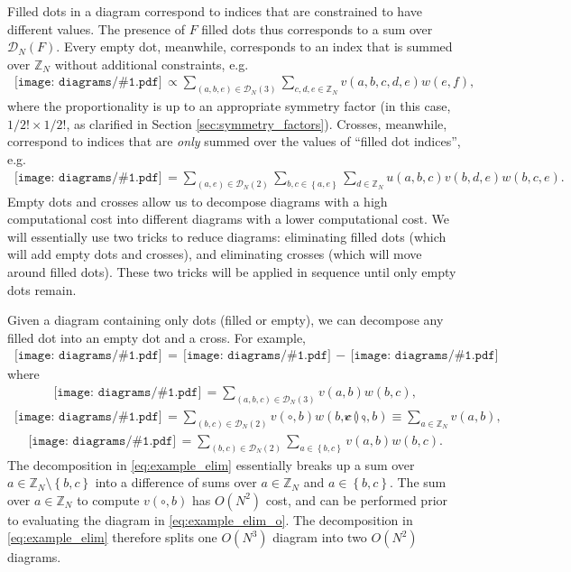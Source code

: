 \documentclass[nofootinbib,notitlepage,11pt]{revtex4-2}
\newcommand{\p}[1]{\left(#1\right)} %
\renewcommand{\set}[1]{\left\{#1\right\}} %
\newcommand{\1}{\mathds{1}}
\newcommand{\D}{\mathcal{D}}
\newcommand{\ZZ}{\mathbb{Z}}
\newcommand{\diagram}[1]
{\,\texttt{[image: diagrams/\#1.pdf]}\,}
\begin{document}
Filled dots in a diagram correspond to indices that are constrained to
have different values.  The presence of $F$ filled dots thus
corresponds to a sum over $\D_N\p{F}$.  Every empty dot, meanwhile,
corresponds to an index that is summed over $\ZZ_N$ without additional
constraints, e.g.
\begin{align}
  \diagram{example_o}
  \propto \sum_{\p{a,b,e}\in\D_N\p{3}} \sum_{c,d,e\in\ZZ_N}
  v\p{a,b,c,d,e} w\p{e,f},
\end{align}
where the proportionality is up to an appropriate symmetry factor (in
this case, $1/2!\times1/2!$, as clarified in Section
\ref{sec:symmetry_factors}).  Crosses, meanwhile, correspond to
indices that are {\it only} summed over the values of ``filled dot
indices'', e.g.
\begin{align}
  \diagram{example_x}
  = \sum_{\p{a,e}\in\D_N\p{2}} \sum_{b,c\in\set{a,e}}
  \sum_{d\in\ZZ_N} u\p{a,b,c} v\p{b,d,e} w\p{b,c,e}.
\end{align}
Empty dots and crosses allow us to decompose diagrams with a high
computational cost into different diagrams with a lower computational
cost.  We will essentially use two tricks to reduce diagrams:
eliminating filled dots (which will add empty dots and crosses), and
eliminating crosses (which will move around filled dots).  These two
tricks will be applied in sequence until only empty dots remain.

Given a diagram containing only dots (filled or empty), we can
decompose any filled dot into an empty dot and a cross.  For example,
\begin{align}
  \diagram{example_elim}
  = \diagram{example_elim_o}
  - \diagram{example_elim_x}
  \label{eq:example_elim}
\end{align}
where
\begin{align}
  \diagram{example_elim}
  = \sum_{\p{a,b,c}\in\D_N\p{3}} v\p{a,b} w\p{b,c},
\end{align}
\begin{align}
  \diagram{example_elim_o}
  = \sum_{\p{b,c}\in\D_N\p{2}} v\p{\circ,b} w\p{b,c},
  &&
  v\p{\circ,b} \equiv \sum_{a\in\ZZ_N} v\p{a,b},
  \label{eq:example_elim_o}
\end{align}
\begin{align}
  \diagram{example_elim_x}
  = \sum_{\p{b,c}\in\D_N\p{2}} \sum_{a\in\set{b,c}}
  v\p{a,b} w\p{b,c}.
  \label{eq:example_elim_x}
\end{align}
The decomposition in \eqref{eq:example_elim} essentially breaks up a
sum over $a\in\ZZ_N\setminus\set{b,c}$ into a difference of sums over
$a\in\ZZ_N$ and $a\in\set{b,c}$.  The sum over $a\in\ZZ_N$ to compute
$v\p{\circ,b}$ has $O\p{N^2}$ cost, and can be performed prior to
evaluating the diagram in \eqref{eq:example_elim_o}.  The
decomposition in \eqref{eq:example_elim} therefore splits one
$O\p{N^3}$ diagram into two $O\p{N^2}$ diagrams.
\end{document}
